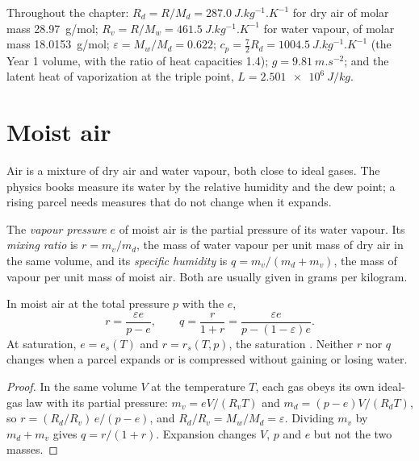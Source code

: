 Throughout the chapter: $R_d = R/M_d = \qty{287.0}{J.kg^{-1}.K^{-1}}$ for dry air of molar mass
\qty{28.97}{g/mol}; $R_v = R/M_w = \qty{461.5}{J.kg^{-1}.K^{-1}}$ for water vapour, of molar
mass \qty{18.0153}{g/mol}; $\varepsilon = M_w/M_d = 0.622$; $c_p = \tfrac72 R_d =
\qty{1004.5}{J.kg^{-1}.K^{-1}}$ (the Year 1 volume, with the ratio of heat capacities 1.4);
$g = \qty{9.81}{m.s^{-2}}$; and the latent heat of vaporization at the triple point,
$L = \qty{2.501e6}{J/kg}$.

\section{Moist air}\label{sec:b2:atmospheric-thermodynamics:moist-air}

Air is a mixture of dry air and water vapour, both close to ideal gases. The physics books
measure its water by the relative humidity and the dew point; a rising parcel needs measures
that do not change when it expands.

\begin{definition}\label{def:b2:atmospheric-thermodynamics:moist-air}
The \emph{vapour pressure} $e$ of moist air is the partial pressure of
its water vapour. Its \emph{mixing ratio} is $r = m_v/m_d$, the mass of water
vapour per unit mass of dry air in the same volume, and its \emph{specific
humidity} is $q = m_v/(m_d + m_v)$, the mass of vapour per unit mass of
moist air. Both are usually given in grams per kilogram.
\end{definition}

\begin{proposition}\label{prop:b2:atmospheric-thermodynamics:humidity}
In moist air at the total pressure $p$ with the  $e$,
\[
  r = \frac{\varepsilon e}{p - e}, \qquad q = \frac{r}{1 + r} = \frac{\varepsilon e}{p - (1 -
  \varepsilon)e} .
\]
At saturation, $e = e_s(T)$ and $r = r_s(T, p)$, the saturation . Neither $r$ nor
$q$ changes when a parcel expands or is compressed without gaining or losing water.
\end{proposition}

\begin{proof}
In the same volume $V$ at the temperature $T$, each gas obeys its own ideal-gas law with its
partial pressure: $m_v = eV/(R_vT)$ and $m_d = (p - e)V/(R_dT)$, so $r = (R_d/R_v)\,e/(p - e)$,
and $R_d/R_v = M_w/M_d = \varepsilon$. Dividing $m_v$ by $m_d + m_v$ gives $q = r/(1 + r)$.
Expansion changes $V$, $p$ and $e$ but not the two masses.
\end{proof}


